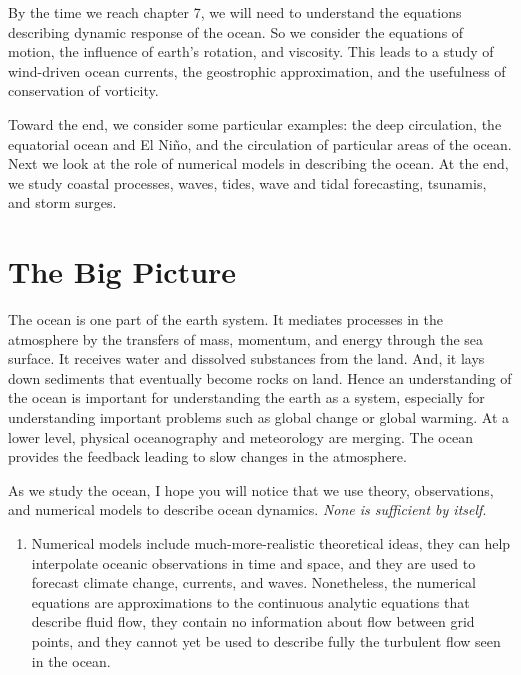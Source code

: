 By the time we reach chapter 7, we will need to understand the equations describing
dynamic response of the ocean. So we consider the equations of motion, the
influence of earth's rotation, and viscosity. This leads to a study of wind-driven
ocean currents, the geostrophic approximation, and the
usefulness of conservation of vorticity.

Toward the end, we consider some particular examples: the deep circulation, the
equatorial ocean and El Ni\~{n}o, and the circulation of particular areas of the
ocean. Next we look at the role of numerical models in describing the ocean.
At the end, we study coastal processes, waves, tides, wave and tidal
forecasting, tsunamis, and storm surges.

\section{The Big Picture}
The ocean is one part of the earth system. It mediates processes in the atmosphere by the transfers of mass, momentum, and energy through the sea surface. It receives water and dissolved substances from the land. And, it lays down sediments that eventually become rocks on land. Hence an understanding of the ocean is important for understanding the earth as a system, especially for understanding important problems such as global change or global warming. At a lower level, physical oceanography and meteorology are merging. The ocean provides the feedback leading to slow changes in the atmosphere.

As we study the ocean, I hope you will notice that we use theory,
observations, and numerical models to describe ocean dynamics.
 \textit{None is sufficient by itself}.
\begin{enumerate}
\vitem Ocean processes are nonlinear and
turbulent. Yet we don't really understand the theory
of non-linear, turbulent flow in complex basins. Theories used to describe the
ocean are much simplified approximations to reality. \vitem
Observations are sparse in time and space.
They provide a rough description of the time-averaged flow, but
many processes in many regions are poorly observed. \item
Numerical models include
much-more-realistic theoretical ideas, they can help interpolate
oceanic observations in time and space, and they are used to
forecast climate change, currents, and waves. Nonetheless, the
numerical equations are approximations to the continuous analytic
equations that describe fluid flow, they contain no information
about flow between grid points, and they cannot yet be used to
describe fully the turbulent flow seen in the ocean.
\end{enumerate}

